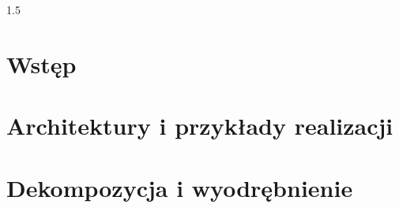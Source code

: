 \documentclass[a4paper, 10pt, twoside]{article}
\begin{document}


    
    \newpage

    
    \newpage


\begin{spacing}{1.5} %
\tableofcontents
\end{spacing}
\newpage

\listoffigures
\newpage

\printglossary[type=\acronymtype,nonumberlist]
\newpage


\section{Wstęp}


\section{Architektury i przykłady realizacji}


\section{Dekompozycja i wyodrębnienie}

\end{document}
